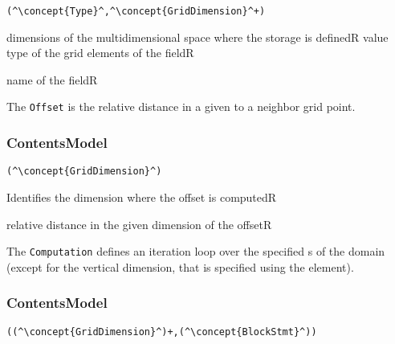 \begin{lstlisting}[style=default,frame=none]
(^\concept{Type}^,^\concept{GridDimension}^+)
\end{lstlisting}

\begin{HIRChildElements}
	{dimensions of the multidimensional space where the storage is defined}{R}
	{value type of the grid elements of the field}{R}
\end{HIRChildElements}

\begin{HIRAttributes}
	{name of the field}{R}
\end{HIRAttributes}


The {\tt Offset} is the relative distance in a given  to a neighbor grid point.

\subsubsection*{ContentsModel}{}

\begin{lstlisting}[style=default,frame=none]
(^\concept{GridDimension}^)
\end{lstlisting}

\begin{HIRChildElements}
	{Identifies the dimension where the offset is computed}{R}
\end{HIRChildElements}

\begin{HIRAttributes}
	{relative distance in the given dimension of the offset}{R}
\end{HIRAttributes}

The {\tt Computation} defines an iteration loop over the specified s of the domain (except for the vertical dimension, 
that is specified using the  element).

\subsubsection*{ContentsModel}{}

\begin{lstlisting}[style=default,frame=none]
((^\concept{GridDimension}^)+,(^\concept{BlockStmt}^))
\end{lstlisting}

